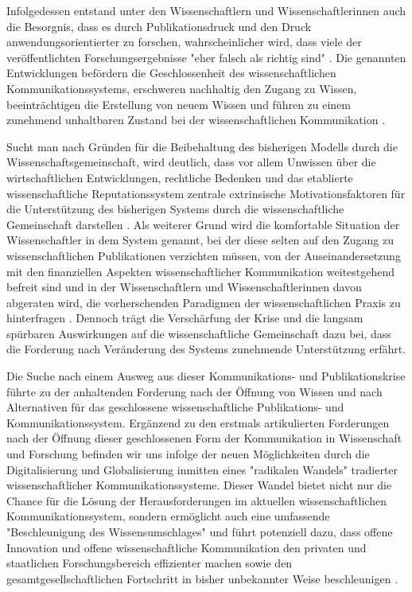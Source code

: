 Infolgedessen entstand unter den Wissenschaftlern und Wissenschaftlerinnen auch die Besorgnis, dass es durch Publikationsdruck und den Druck anwendungsorientierter zu forschen, wahrscheinlicher wird, dass viele der veröffentlichten Forschungsergebnisse "eher falsch als richtig sind" \cite{Ioannidis_2005}. Die genannten Entwicklungen befördern die Geschlossenheit des wissenschaftlichen Kommunikationssystems, erschweren nachhaltig den Zugang zu Wissen, beeinträchtigen die Erstellung von neuem Wissen \cite{cite:5} \cite{cite:8} \cite{Luhmann1998} und führen zu einem zunehmend unhaltbaren Zustand bei der wissenschaftlichen Kommunikation \cite{Schekman_2013}.

Sucht man nach Gründen für die Beibehaltung des bisherigen Modells durch die Wissenschaftsgemeinschaft, wird deutlich, dass vor allem Unwissen über die wirtschaftlichen Entwicklungen, rechtliche Bedenken und das etablierte wissenschaftliche Reputationssystem zentrale extrinsische Motivationsfaktoren für die Unterstützung des bisherigen Systems durch die wissenschaftliche Gemeinschaft darstellen \cite{minssen_2012_arbeit}. Als weiterer Grund wird die komfortable Situation der Wissenschaftler in dem System genannt, bei der diese selten auf den Zugang zu wissenschaftlichen Publikationen verzichten müssen, von der Auseinandersetzung mit den finanziellen Aspekten wissenschaftlicher Kommunikation weitestgehend befreit sind \cite{herb_2010} \cite{Sietmann_oa_2007} \cite{hanekop_2006} und in der Wissenschaftlern und Wissenschaftlerinnen davon abgeraten wird, die vorherschenden Paradigmen der wissenschaftlichen Praxis zu hinterfragen \cite{Siegfried_2013} \cite{loeb_2013_thinking}. Dennoch trägt die Verschärfung der Krise und die langsam spürbaren Auswirkungen auf die wissenschaftliche Gemeinschaft dazu bei, dass die Forderung nach Veränderung des Systems zunehmende Unterstützung erfährt.

Die Suche nach einem Ausweg aus dieser Kommunikations- und Publikationskrise führte zu der anhaltenden Forderung nach der Öffnung von Wissen und nach Alternativen für das geschlossene wissenschaftliche Publikations- und Kommunikationssystem. Ergänzend zu den erstmals artikulierten Forderungen nach der Öffnung dieser geschlossenen Form der Kommunikation in Wissenschaft und Forschung befinden wir uns infolge der neuen Möglichkeiten durch die Digitalisierung und Globalisierung \cite{mcluhan_1962_gutenberg} inmitten eines "radikalen Wandels" \cite{poynder_2011_suber} tradierter wissenschaftlicher Kommunikationssysteme. Dieser Wandel bietet nicht nur die Chance für die Lösung der Herausforderungen im aktuellen wissenschaftlichen Kommunikationssystem, sondern ermöglicht auch eine umfassende "Beschleunigung des Wissensumschlages" \cite{Wenzel_2003} und führt potenziell dazu, dass offene Innovation und offene wissenschaftliche Kommunikation den privaten und staatlichen Forschungsbereich effizienter machen \cite{chesbrough_2006_open} sowie den gesamtgesellschaftlichen Fortschritt in bisher unbekannter Weise beschleunigen \cite{cite:7}.

